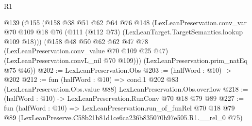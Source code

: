 \begin{lexlean}{R1}
\begin{coremodule}
  @139
    (@155
      (@158
        @38
        @51
        @62
        @64
        @76
        @148
        (LexLeanPreservation.conv_var
          @70
          @109
          @18
          @76
          (@111 (@112 @73) (LexLeanTarget.TargetSemantics.lookup @109 @18)))
        (@158
          @48
          @50
          @62
          @62
          @47
          @78
          (LexLeanPreservation.conv_value @70 @109 @25 @47)
          (LexLeanPreservation.convL_nil @70 @109)))
      (LexLeanPreservation.prim_natEq @75 @46))
@202 := LexLeanPreservation.Obs
@203 := (halfWord : @10) -> @202
@212 := fun (halfWord : @10) =>
  cond.{1} @202 @83 (LexLeanPreservation.Obs.value @88) LexLeanPreservation.Obs.overflow
@218 := (halfWord : @10) -> LexLeanPreservation.RunConv @70 @18 @79 @89
@227 := fun (halfWord : @10) =>
  LexLeanPreservation.run_of_funRel
    @70
    @18
    @79
    @89
    (LexLeanPreserve.C58b21b81d1ce6ca236b835070b97e505.R1.__rel_0 @75)
\end{coremodule}
\end{lexlean}
